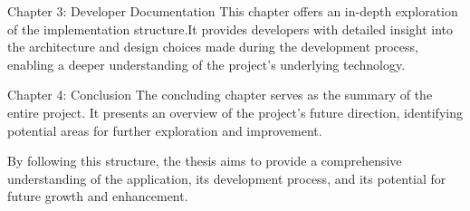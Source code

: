 Chapter 3: Developer Documentation \newline
This chapter offers an in-depth exploration of the implementation structure.It provides developers with detailed insight into the architecture and design choices made during the development process, enabling a deeper understanding of the project's underlying technology.

Chapter 4: Conclusion \newline
The concluding chapter serves as the summary of the entire project. It presents an overview of the project's future direction, identifying potential areas for further exploration and improvement.

By following this structure, the thesis aims to provide a comprehensive understanding of the application, its development process, and its potential for future growth and enhancement.